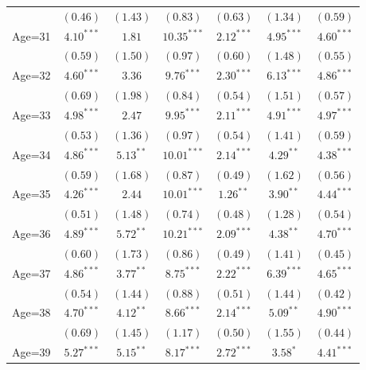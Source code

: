 \documentclass[fullpage]{paper}
\begin{document}
\begin{center}
\begin{longtable}{l c c c c c c }
            & $(0.46)$      & $(1.43)$      & $(0.83)$       & $(0.63)$     & $(1.34)$      & $(0.59)$      \\
Age=31      & $4.10^{***}$  & $1.81$        & $10.35^{***}$  & $2.12^{***}$ & $4.95^{***}$  & $4.60^{***}$  \\
            & $(0.59)$      & $(1.50)$      & $(0.97)$       & $(0.60)$     & $(1.48)$      & $(0.55)$      \\
Age=32      & $4.60^{***}$  & $3.36$        & $9.76^{***}$   & $2.30^{***}$ & $6.13^{***}$  & $4.86^{***}$  \\
            & $(0.69)$      & $(1.98)$      & $(0.84)$       & $(0.54)$     & $(1.51)$      & $(0.57)$      \\
Age=33      & $4.98^{***}$  & $2.47$        & $9.95^{***}$   & $2.11^{***}$ & $4.91^{***}$  & $4.97^{***}$  \\
            & $(0.53)$      & $(1.36)$      & $(0.97)$       & $(0.54)$     & $(1.41)$      & $(0.59)$      \\
Age=34      & $4.86^{***}$  & $5.13^{**}$   & $10.01^{***}$  & $2.14^{***}$ & $4.29^{**}$   & $4.38^{***}$  \\
            & $(0.59)$      & $(1.68)$      & $(0.87)$       & $(0.49)$     & $(1.62)$      & $(0.56)$      \\
Age=35      & $4.26^{***}$  & $2.44$        & $10.01^{***}$  & $1.26^{**}$  & $3.90^{**}$   & $4.44^{***}$  \\
            & $(0.51)$      & $(1.48)$      & $(0.74)$       & $(0.48)$     & $(1.28)$      & $(0.54)$      \\
Age=36      & $4.89^{***}$  & $5.72^{**}$   & $10.21^{***}$  & $2.09^{***}$ & $4.38^{**}$   & $4.70^{***}$  \\
            & $(0.60)$      & $(1.73)$      & $(0.86)$       & $(0.49)$     & $(1.41)$      & $(0.45)$      \\
Age=37      & $4.86^{***}$  & $3.77^{**}$   & $8.75^{***}$   & $2.22^{***}$ & $6.39^{***}$  & $4.65^{***}$  \\
            & $(0.54)$      & $(1.44)$      & $(0.88)$       & $(0.51)$     & $(1.44)$      & $(0.42)$      \\
Age=38      & $4.70^{***}$  & $4.12^{**}$   & $8.66^{***}$   & $2.14^{***}$ & $5.09^{**}$   & $4.90^{***}$  \\
            & $(0.69)$      & $(1.45)$      & $(1.17)$       & $(0.50)$     & $(1.55)$      & $(0.44)$      \\
Age=39      & $5.27^{***}$  & $5.15^{**}$   & $8.17^{***}$   & $2.72^{***}$ & $3.58^{*}$    & $4.41^{***}$  \\

\end{longtable}
\end{center}
\end{document}

